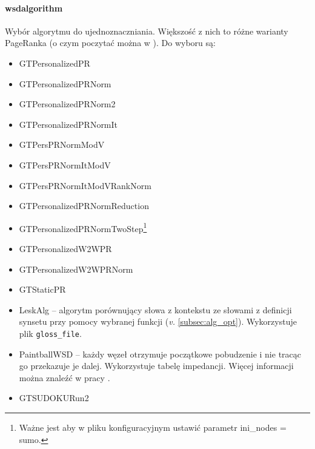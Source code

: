 \documentclass[10pt,a4paper]{article}
\begin{document}
\paragraph{wsdalgorithm}
Wybór algorytmu do ujednoznaczniania. Większość z nich to różne warianty PageRanka (o czym poczytać można w \cite{pr}). Do wyboru są:
\begin{itemize}
	\item GTPersonalizedPR
	\item GTPersonalizedPRNorm
	\item GTPersonalizedPRNorm2
	\item GTPersonalizedPRNormIt
	\item GTPersPRNormModV
	\item GTPersPRNormItModV
	\item GTPersPRNormItModVRankNorm
	\item GTPersonalizedPRNormReduction
	\item GTPersonalizedPRNormTwoStep\footnote{Ważne jest aby w pliku konfiguracyjnym ustawić parametr ini\_nodes = sumo.} %
	\item GTPersonalizedW2WPR
	\item GTPersonalizedW2WPRNorm
	\item GTStaticPR
	\item LeskAlg -- algorytm porównujący słowa z kontekstu ze słowami z definicji synsetu przy pomocy wybranej funkcji (\textit{v.} \ref{subsec:alg_opt}). Wykorzystuje plik \texttt{gloss\_file}.
	\item PaintballWSD -- każdy węzeł otrzymuje początkowe pobudzenie i nie tracąc go przekazuje je dalej. Wykorzystuje tabelę impedancji. Więcej informacji można znaleźć w pracy \cite{pb}.
	\item GTSUDOKURun2 %
\end{itemize}
\end{document}

